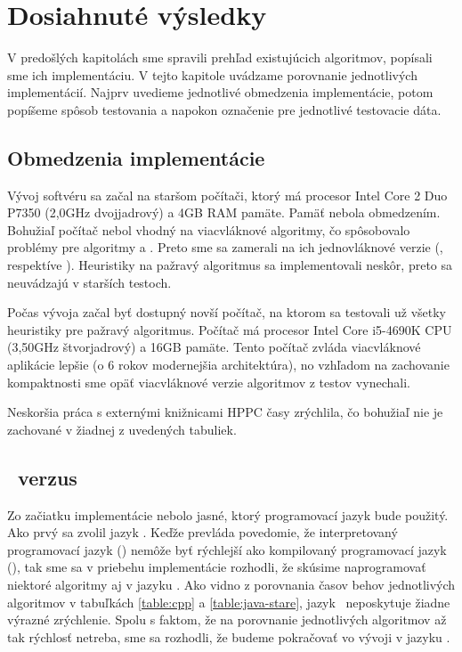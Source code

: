 \chapter{Dosiahnuté výsledky}\label{chap:vysledky}

V predošlých kapitolách sme spravili prehľad existujúcich algoritmov, popísali 
sme ich implementáciu. V tejto kapitole uvádzame porovnanie jednotlivých 
implementácií. Najprv uvedieme jednotlivé obmedzenia implementácie, potom 
popíšeme spôsob testovania a napokon označenie pre jednotlivé testovacie dáta.

\section{Obmedzenia implementácie}

Vývoj softvéru sa začal na staršom počítači, ktorý má procesor Intel Core 2 
Duo P7350 (2,0GHz dvojjadrový) a 4GB RAM pamäte. Pamäť nebola obmedzením. 
Bohužiaľ počítač 
nebol vhodný na viacvláknové algoritmy, čo spôsobovalo problémy pre algoritmy 
 a . Preto sme sa zamerali na ich jednovláknové 
verzie (, respektíve ). Heuristiky na pažravý 
algoritmus sa implementovali neskôr, preto sa neuvádzajú v starších testoch.

Počas vývoja začal byť dostupný novší počítač, na ktorom sa testovali už všetky 
heuristiky pre pažravý algoritmus. Počítač má procesor Intel Core i5-4690K CPU 
(3,50GHz štvorjadrový) a 16GB pamäte. Tento počítač zvláda viacvláknové 
aplikácie lepšie (o 6 rokov modernejšia architektúra), no 
vzhľadom na zachovanie kompaktnosti sme opäť viacvláknové verzie algoritmov z 
testov vynechali.

Neskoršia práca s externými knižnicami HPPC časy zrýchlila, čo bohužiaľ nie je 
zachované v žiadnej z uvedených tabuliek.

\section{\Java\ verzus \cpp}

Zo začiatku implementácie nebolo jasné, ktorý programovací jazyk bude použitý. 
Ako prvý sa zvolil jazyk \Java. Keďže prevláda povedomie, že interpretovaný 
programovací jazyk (\Java) nemôže byť rýchlejší ako kompilovaný programovací 
jazyk (\cpp), tak sme sa v priebehu implementácie rozhodli, že skúsime 
naprogramovať niektoré algoritmy aj v jazyku \cpp. Ako vidno z porovnania časov 
behov jednotlivých algoritmov v tabuľkách \ref{table:cpp} a 
\ref{table:java-stare}, jazyk \cpp\ neposkytuje žiadne 
výrazné zrýchlenie. Spolu s faktom, že na porovnanie jednotlivých algoritmov až 
tak rýchlosť netreba, sme sa rozhodli, že budeme pokračovať vo vývoji v jazyku 
\Java.

